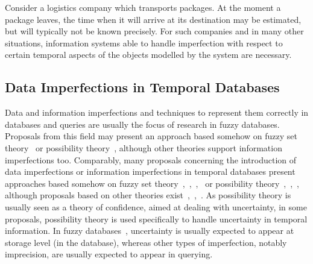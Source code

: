 %
%
Consider a logistics company which transports packages. At the moment a package leaves, the time when it will arrive at its destination may be estimated, but will typically not be known precisely. For such companies and in many other situations, information systems able to handle imperfection with respect to certain temporal aspects of the objects modelled by the system are necessary.

\subsection{Data Imperfections in Temporal Databases}


Data and information imperfections and techniques to represent them correctly in databases and queries are usually the focus of research in fuzzy databases. Proposals from this field may present an approach based somehow on fuzzy set theory~\cite{Zadeh65} or possibility theory~\cite{Dubois:Prade:1988:PossibilityTheory}, although other theories support information imperfections too. Comparably, many proposals concerning the introduction of data imperfections or information imperfections in temporal databases present approaches based somehow on fuzzy set theory~\cite{garrido2009},~\cite{gal01},~\cite{nagypal2003},~\cite{Billiet:Pons:Matthe:DeTre:Pons:2011:BipolarFuzzy} or possibility theory~\cite{Dubois89},~\cite{Pon11},~\cite{129895}, although proposals based on other theories exist~\cite{Dyreson1998},~\cite{Dekhtyar2001},~\cite{Qia09}. As possibility theory is usually seen as a theory of confidence, aimed at dealing with uncertainty, in some proposals, possibility theory is used specifically to handle uncertainty in temporal information. In fuzzy databases~\cite{Galindo2006}, uncertainty is usually expected to appear at storage level (in the database), whereas other types of imperfection, notably imprecision, are usually expected to appear in querying. 

